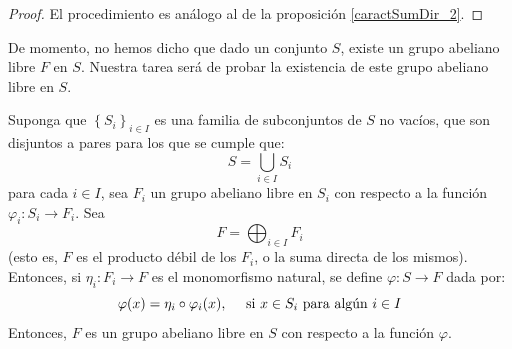 \documentclass[12pt]{report}
\theoremstyle{largebreak}
\newcommand\cf[3]{\ensuremath{#1:#2\rightarrow#3}}
\begin{document}
    \begin{proof}
        El procedimiento es análogo al de la proposición \ref{caractSumDir_2}.
    \end{proof}

    De momento, no hemos dicho que dado un conjunto $S$, existe un grupo abeliano libre $F$ en $S$. Nuestra tarea será de probar la existencia de este grupo abeliano libre en $S$.

    \begin{propo}
        \label{caracProdFreeAbelian}
        Suponga que $\left\{S_i \right\}_{i\in I}$ es una familia de subconjuntos de $S$ no vacíos, que son disjuntos a pares para los que se cumple que:
        \begin{equation*}
            S=\bigcup_{ i\in I}S_i
        \end{equation*}
        para cada $i\in I$, sea $F_i$ un grupo abeliano libre en $S_i$ con respecto a la función $\cf{\varphi_i}{S_i}{F_i}$. Sea
        \begin{equation*}
            F=\bigoplus_{ i\in I}F_i
        \end{equation*}
        (esto es, $F$ es el producto débil de los $F_i$, o la suma directa de los mismos). Entonces, si $\cf{\eta_i}{F_i}{F}$ es el monomorfismo natural, se define $\cf{\varphi}{S}{F}$ dada por:
        \begin{equation*}
            \varphi(x)=\eta_i\circ\varphi_i(x),\quad\textup{ si }x\in S_i\textup{ para algún }i\in I
        \end{equation*}
        Entonces, $F$ es un grupo abeliano libre en $S$ con respecto a la función $\varphi$.
    \end{propo}
\end{document}
